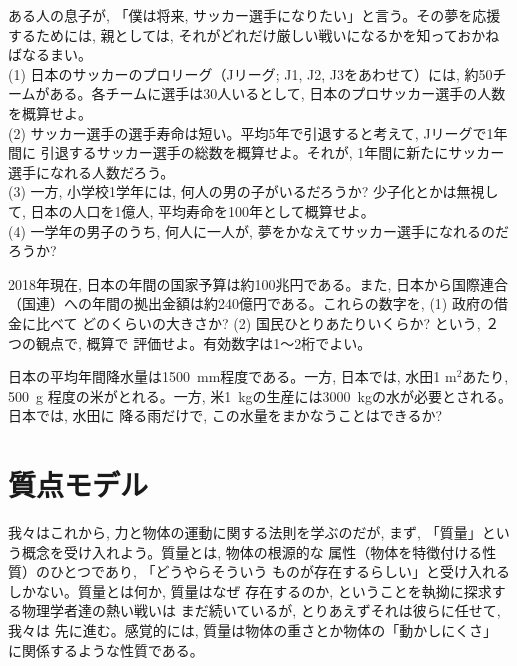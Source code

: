 \begin{q}\label{q:soccer}
ある人の息子が, 「僕は将来, サッカー選手になりたい」と言う。その夢を応援
するためには, 親としては, それがどれだけ厳しい戦いになるかを知っておかねばなるまい。\\
(1) 日本のサッカーのプロリーグ（Jリーグ; J1, J2, J3をあわせて）には, 
約50チームがある。各チームに選手は30人いるとして, 日本のプロサッカー選手の人数を概算せよ。\\
(2) サッカー選手の選手寿命は短い。平均5年で引退すると考えて, Jリーグで1年間に
引退するサッカー選手の総数を概算せよ。それが, 1年間に新たにサッカー選手になれる人数だろう。\\
(3) 一方, 小学校1学年には, 何人の男の子がいるだろうか? 少子化とかは無視して, 日本の人口を1億人, 平均寿命を100年として概算せよ。\\
(4) 一学年の男子のうち, 何人に一人が, 夢をかなえてサッカー選手になれるのだろうか? 
\end{q}
\mv

\begin{q}\label{q:Japan_debt}
2018年現在, 日本の年間の国家予算は約100兆円である。また, 日本から国際連合
（国連）への年間の拠出金額は約240億円である。これらの数字を, (1) 政府の借金に比べて
どのくらいの大きさか?  (2) 国民ひとりあたりいくらか? という, ２つの観点で, 概算で
評価せよ。有効数字は1〜2桁でよい。
\end{q}
\vspace{0.2cm}

\begin{q}\label{q:Japan_rain_paddy}
日本の平均年間降水量は1500~mm程度である。一方, 日本では, 水田1 m$^2$あたり, 500~g
程度の米がとれる。一方, 米1~kgの生産には3000~kgの水が必要とされる。日本では, 水田に
降る雨だけで, この水量をまかなうことはできるか?
\end{q}
\hv



\section{質点モデル}

我々はこれから, 力と物体の運動に関する法則を学ぶのだが, まず, 
「質量」という概念を受け入れよう。質量とは, 物体の根源的な
属性（物体を特徴付ける性質）のひとつであり, 「どうやらそういう
ものが存在するらしい」と受け入れるしかない。質量とは何か, 質量はなぜ
存在するのか, ということを執拗に探求する物理学者達の熱い戦いは
まだ続いているが, とりあえずそれは彼らに任せて, 我々は
先に進む。感覚的には, 質量は物体の重さとか物体の「動かしにくさ」
に関係するような性質である。\mv

